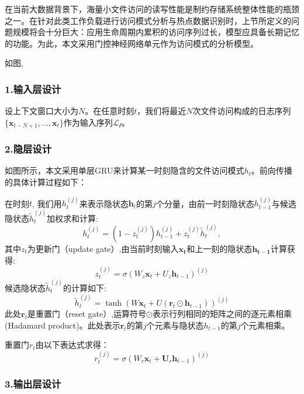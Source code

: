 在当前大数据背景下，海量小文件访问的读写性能是制约存储系统整体性能的瓶颈之一。在针对此类工作负载进行访问模式分析与热点数据识别时，上节所定义的问题规模将会十分巨大：应用生命周期内累积的访问序列过长，模型应具备长期记忆的功能。为此，本文采用门控神经网络单元作为访问模式的分析模型。

{\color{red}如图},

\subsubsection*{1.输入层设计}

设上下文窗口大小为$N$。在任意时刻$t$，我们将最近$N$次文件访问构成的日志序列$\{\mathbf{x}_{t-N+1}, \dots, \mathbf{x}_t\}$作为输入序列$\mathcal{L_t}$。

\subsubsection*{2.隐层设计}
如图所示，本文采用单层GRU来计算某一时刻隐含的文件访问模式$h_t$。前向传播的具体计算过程如下：

在时刻$t$, 我们用$h_t^{(j)}$来表示隐状态$\mathbf{h}_t$的第$j$个分量，由前一时刻隐状态$h_{t-1}^{(j)}$与候选隐状态$\tilde{h}_t^{(j)}$加权求和计算:
\begin{equation}
    h_t^{(j)} = (1-z_t^{(j)}) h_{t-1}^{(j)} + z_t^{(j)}\tilde{h}_t^{(j)},
\end{equation}
其中$z_t$为更新门（update gate）,由当前时刻输入$\mathbf{x_t}$和上一刻的隐状态$\mathbf{h_{t-1}}$计算获得:
\begin{equation}
z_t^{(j)} = \sigma(W_z \mathbf{x}_t + U_z \mathbf{h}_{t-1})^{(j)}
\end{equation}
候选隐状态$\tilde{h}_t^{(j)}$的计算如下:
\begin{equation}
    \tilde{h}_t^{(j)} = \tanh(W \mathbf{x}_t + U (\mathbf{r}_t \odot \mathbf{h}_{t-1}))^{(j)}
\end{equation}
此处$\mathbf{r}_t$是重置门（reset gate）,运算符号$\odot$表示行列相同的矩阵之间的逐元素相乘(Hadamard product)。此处表示$\mathbf{r}_t$的第$j$个元素与隐状态$h_{t-1}$的第$j$个元素相乘。

重置门$r_t$由以下表达式求得：
\begin{equation}
    r_t^{(j)} = \sigma(W_r \mathbf{x}_t + \mathbf{U}_r \mathbf{h}_{t-1})^{(j)}
\end{equation}

\subsubsection*{3.输出层设计}

